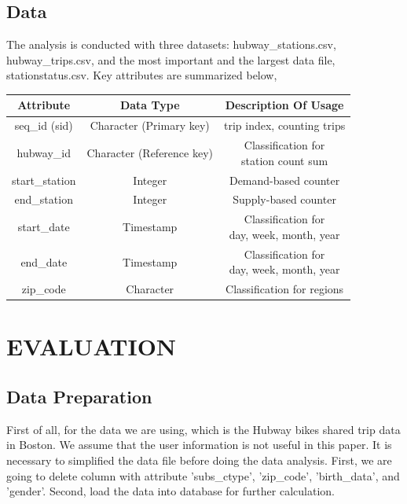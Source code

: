 \documentclass[journal, letterpaper]{IEEEtran}
\begin{document}
\subsection{Data}
The analysis is conducted with three datasets: hubway\_stations.csv, hubway\_trips.csv, and the most important and the largest data file, stationstatus.csv. Key attributes are summarized below, 
\begin{table}[ht]
\centering %
\begin{tabular}{c| c| c} %
\hline\hline %
Attribute & Data Type & Description Of Usage  \\  %
\hline %
seq\_id (sid) & Character (Primary key) & trip index, counting trips  \\ %
\hline
hubway\_id & Character (Reference key) & \pbox{20cm}{Classification for \\ station count sum}  \\
\hline
start\_station & Integer & Demand-based counter  \\
\hline
end\_station & Integer & Supply-based counter   \\
\hline
start\_date & Timestamp & \pbox{20cm}{Classification for \\ day, week, month, year}  \\  %
\hline
end\_date & Timestamp & \pbox{20cm}{Classification for \\ day, week, month, year} \\
\hline
zip\_code & Character & Classification for regions \\
\hline %
\end{tabular}
\label{table:nonlin} %
\end{table}

\section{EVALUATION}
\large
\subsection{Data Preparation}
First of all, for the data we are using, which is the Hubway bikes shared trip data in Boston. We assume that the user information is not useful in this paper. It is necessary to simplified the data file before doing the data analysis. First, we are going to delete column with attribute 'subs\_ctype', 'zip\_code', 'birth\_data', and 'gender'. Second, load the data into database for further calculation. 
\end{document}
